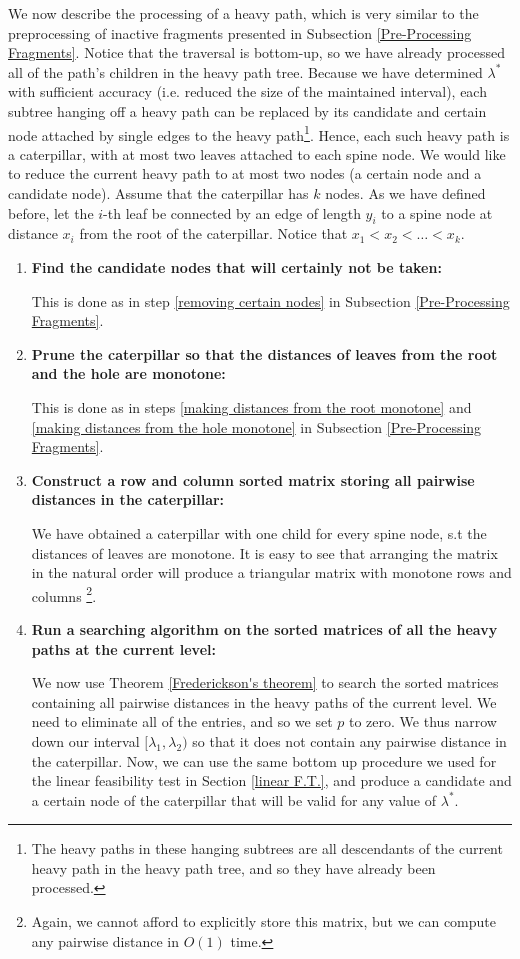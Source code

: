 \documentclass[a4paper,UKenglish]{lipics-v2016}
\theoremstyle{plain}
\begin{document}
We now describe the processing of a heavy path, which is very similar to the preprocessing of inactive fragments presented in Subsection \ref{Pre-Processing Fragments}. Notice that the traversal is bottom-up, so we have already processed all of the path's children in the heavy path tree. Because we have determined $\lambda^*$ with sufficient accuracy (i.e. reduced the size of the maintained interval), each subtree hanging off a heavy path can be replaced by its candidate and certain node attached by single edges to the heavy path\footnote{The heavy paths in these hanging subtrees are all descendants of the current heavy path in the heavy path tree, and so they have already been processed.}. Hence, each such heavy path is a caterpillar, with at most two leaves attached to each spine node. We would like to reduce the current heavy path to at most two nodes (a certain node and a candidate node).
Assume that the caterpillar has $k$ nodes. As we have defined before, let the $i$-th leaf be connected by an edge of length $y_i$ to a spine node at distance $x_i$ from the root of the caterpillar. Notice that $x_1 < x_2 < \ldots < x_k$.
\begin{enumerate}
\item\textbf{Find the candidate nodes that will certainly not be taken:}

This is done as in step \ref{removing certain nodes} in Subsection \ref{Pre-Processing Fragments}.
\item\textbf{Prune the caterpillar so that the distances of leaves from the root and the hole are monotone:}	

This is done as in steps \ref{making distances from the root monotone} and \ref{making distances from the hole monotone} in Subsection \ref{Pre-Processing Fragments}.
\item\textbf{Construct a row and column sorted matrix storing all pairwise distances in the caterpillar:}

We have obtained a caterpillar with one child for every spine node, s.t the distances of leaves are monotone. It is easy to see that arranging the matrix in the natural order will produce a triangular matrix with monotone rows and columns \footnote{Again, we cannot afford to explicitly store this matrix, but we can compute any pairwise distance in $O(1)$ time.}.
\item\textbf{Run a searching algorithm on the sorted matrices of all the heavy paths at the current level:}

We now use Theorem \ref{Frederickson's theorem} to search the sorted matrices containing all pairwise distances in the heavy paths of the current level. We need to eliminate all of the entries, and so we set $p$ to zero. We thus narrow down our interval $[\lambda_1,\lambda_2)$ so that it does not contain any pairwise distance in the caterpillar. Now, we can use the same bottom up procedure we used for the linear feasibility test in Section \ref{linear F.T.}, and produce a candidate and a certain node of the caterpillar that will be valid for any value of $\lambda^*$.
\end{enumerate}
\end{document}
